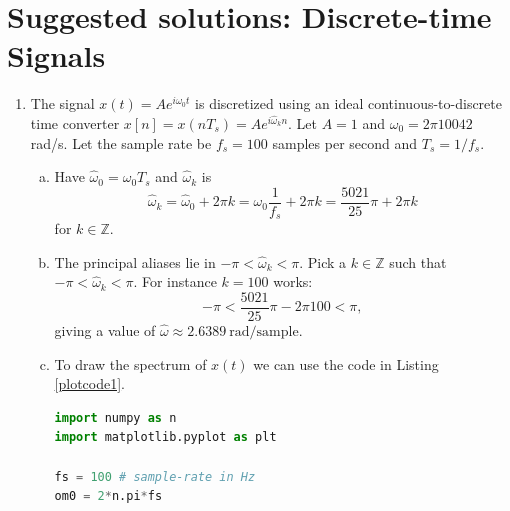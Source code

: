 \newpage
\section{Suggested solutions: Discrete-time Signals}
\begin{enumerate}
\item The signal $x(t)=Ae^{i\omega_{0}t}$ is discretized using an ideal continuous-to-discrete time converter $x[n]=x(nT_{s})=Ae^{i\hat{\omega}_{k}n}$. Let $A=1$ and $\omega_{0}=2\pi 10042$ rad/s. Let the sample rate be $f_{s}=100$ samples per second and $T_{s}=1/f_{s}$.

\begin{enumerate}[a)]
\item Have $\hat{\omega}_{0}=\omega_{0}T_{s}$ and $\hat{\omega}_{k}$ is
$$\hat{\omega}_{k}=\hat{\omega}_{0}+2\pi k=\omega_{0}\frac{1}{f_{s}}+2\pi k=\frac{5021}{25}\pi+2\pi k$$
for $k\in\mathbb{Z}$. 

\item The principal aliases lie in $-\pi<\hat{\omega}_{k}<\pi$. Pick a $k\in\mathbb{Z}$ such that $-\pi<\hat{\omega}_{k}<\pi$. For instance $k=100$ works:
$$-\pi < \frac{5021}{25}\pi-2\pi 100 < \pi,$$
giving a value of $\hat{\omega}\approx2.6389\ \text{rad/sample}$. 

\item To draw the spectrum of $x(t)$ we can use the code in Listing \ref{plotcode1}.

\begin{lstlisting}[language=Python, caption=Spectrum of $x(t)$,label=plotcode1]
import numpy as n
import matplotlib.pyplot as plt

fs = 100 # sample-rate in Hz
om0 = 2*n.pi*fs


\end{lstlisting}
\end{enumerate}
\end{enumerate}
